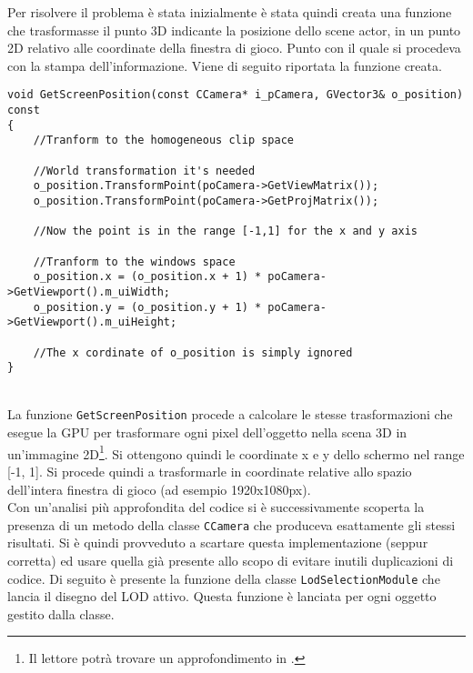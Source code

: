 Per risolvere il problema è stata inizialmente è stata quindi creata una funzione che trasformasse il punto 3D indicante la posizione dello scene actor, in un punto 2D relativo alle coordinate della finestra di gioco. Punto con il quale si procedeva con la stampa dell'informazione. Viene di seguito riportata la funzione creata.\\

\begin{lstlisting}[style=maurizio-code, caption=Metodo per la trasformazione di un punto 3D in un punto 2D della finestra di gioco rispetto la telecamera corrente, label={code:getScreenPosition}]
void GetScreenPosition(const CCamera* i_pCamera, GVector3& o_position) const
{	
	//Tranform to the homogeneous clip space
	
	//World transformation it's needed
	o_position.TransformPoint(poCamera->GetViewMatrix());
	o_position.TransformPoint(poCamera->GetProjMatrix());
	
	//Now the point is in the range [-1,1] for the x and y axis
	
	//Tranform to the windows space
	o_position.x = (o_position.x + 1) * poCamera->GetViewport().m_uiWidth;
	o_position.y = (o_position.y + 1) * poCamera->GetViewport().m_uiHeight;
	
	//The x cordinate of o_position is simply ignored 
}
\end{lstlisting}
~\\
La funzione \texttt{GetScreenPosition} procede a calcolare le stesse trasformazioni che esegue la GPU per trasformare ogni pixel dell'oggetto nella scena 3D in un'immagine 2D\footnote{Il lettore potrà trovare un approfondimento in \cite[chp.~5]{inbook:directx-book}.}. Si ottengono quindi le coordinate x e y dello schermo nel range [-1, 1]. Si procede quindi a trasformarle in coordinate relative allo spazio dell'intera finestra di gioco (ad esempio 1920x1080px).\\

Con un'analisi più approfondita del codice si è successivamente scoperta la presenza di un metodo della classe \texttt{CCamera} che produceva esattamente gli stessi risultati. Si è quindi provveduto a scartare questa implementazione (seppur corretta) ed usare quella già presente allo scopo di evitare inutili duplicazioni di codice. Di seguito è presente la funzione della classe \texttt{LodSelectionModule} che lancia il disegno del LOD attivo. Questa funzione è lanciata per ogni oggetto gestito dalla classe.\\\vspace*{-0.3cm}

